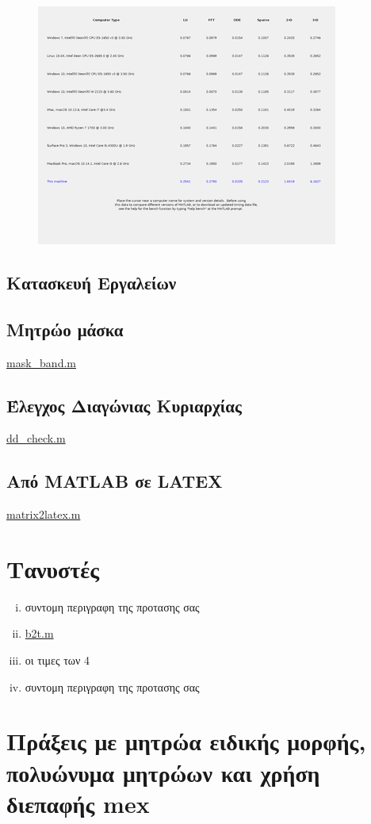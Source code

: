\documentclass{article}
\begin{document}
\begin{figure}[h]
\includegraphics[scale=0.9]{image2}
\end{figure}

\subsection{Κατασκευή Εργαλείων}
\subsection{Μητρώο μάσκα}
\href{run:./mask_band.m}{mask\_band.m}
\subsection{Έλεγχος Διαγώνιας Κυριαρχίας}
\href{run:./dd_check.m}{dd\_check.m}
\subsection{Από MATLAB σε LATEX}
\href{run:./matrix2latex.m}{matrix2latex.m}

\section{Τανυστές}
\begin{enumerate}[i.]
    \item συντομη περιγραφη της προτασης σας
    \item \href{run:/b2t.m}{b2t.m}
    \item οι τιμες των 4
    \item συντομη περιγραφη της προτασης σας
\end{enumerate}

\section{Πράξεις με μητρώα ειδικής μορφής, πολυώνυμα μητρώων
και χρήση διεπαφής mex}
\end{document}
